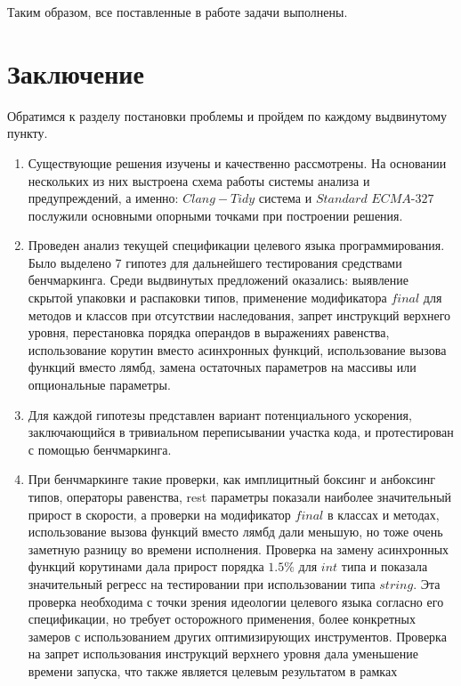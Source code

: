 \documentclass{mipt-thesis-bs}
\begin{document}
Таким образом, все поставленные в работе задачи выполнены.

\chapter{Заключение}

Обратимся к разделу постановки проблемы и пройдем по каждому выдвинутому пункту.

\begin{enumerate}
    \item Существующие решения изучены и качественно рассмотрены.
    На основании нескольких из них выстроена схема
    работы системы анализа и предупреждений, а именно: $Clang-Tidy$ система и $Standard$ $ECMA$-$327$ послужили основными опорными
    точками при построении решения.
    \item Проведен анализ текущей спецификации целевого языка программирования. Было выделено 7 гипотез для дальнейшего тестирования
    средствами бенчмаркинга. Среди выдвинутых предложений оказались: выявление скрытой упаковки
    и распаковки типов, применение модификатора $final$ для методов и классов при отсутствии наследования,
    запрет инструкций верхнего уровня, перестановка порядка операндов в выражениях равенства,
    использование корутин вместо асинхронных функций, использование вызова функций вместо лямбд,
    замена остаточных параметров на массивы или опциональные параметры.
    \item Для каждой гипотезы представлен вариант потенциального ускорения, заключающийся в тривиальном
    переписывании участка кода, и протестирован с помощью бенчмаркинга.
    \item При бенчмаркинге такие проверки, как имплицитный боксинг и анбоксинг типов, операторы равенства, rest
    параметры показали наиболее значительный прирост в скорости, а проверки на модификатор $final$ в классах
    и методах, использование вызова функций вместо лямбд дали меньшую, но тоже очень заметную разницу
    во времени исполнения. Проверка на замену асинхронных функций корутинами дала прирост порядка $1.5\%$ для
    $int$ типа и показала значительный регресс на тестировании при использовании типа $string$. Эта проверка
    необходима с точки зрения идеологии целевого языка согласно его спецификации, но требует осторожного применения,
    более конкретных замеров с использованием других оптимизирующих инструментов. Проверка на запрет использования
    инструкций верхнего уровня дала уменьшение времени запуска, что также является целевым результатом в рамках

\end{enumerate}
\end{document}
